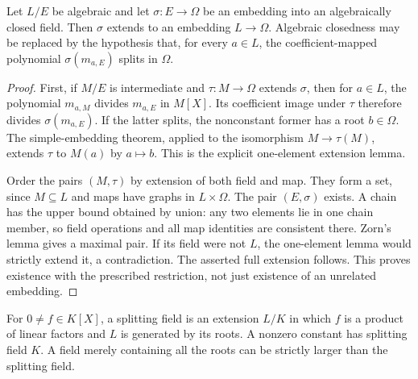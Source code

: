 \begin{theorem}\label{thm:field-extension-embedding}
Let $L/E$ be algebraic and let $\sigma:E\to\Omega$ be an embedding into an algebraically closed field. Then $\sigma$ extends to an embedding $L\to\Omega$. Algebraic closedness may be replaced by the hypothesis that, for every $a\in L$, the coefficient-mapped polynomial $\sigma(m_{a,E})$ splits in $\Omega$.
\end{theorem}
\begin{proof}
First, if $M/E$ is intermediate and $\tau:M\to\Omega$ extends $\sigma$, then for $a\in L$, the polynomial $m_{a,M}$ divides $m_{a,E}$ in $M[X]$. Its coefficient image under $\tau$ therefore divides $\sigma(m_{a,E})$. If the latter splits, the nonconstant former has a root $b\in\Omega$. The simple-embedding theorem, applied to the isomorphism $M\to\tau(M)$, extends $\tau$ to $M(a)$ by $a\mapsto b$. This is the explicit one-element extension lemma.

Order the pairs $(M,\tau)$ by extension of both field and map. They form a set, since $M\subseteq L$ and maps have graphs in $L\times\Omega$. The pair $(E,\sigma)$ exists. A chain has the upper bound obtained by union: any two elements lie in one chain member, so field operations and all map identities are consistent there. Zorn's lemma gives a maximal pair. If its field were not $L$, the one-element lemma would strictly extend it, a contradiction. The asserted full extension follows. This proves existence with the prescribed restriction, not just existence of an unrelated embedding.
\end{proof}

\begin{definition}
For $0\ne f\in K[X]$, a splitting field is an extension $L/K$ in which $f$ is a product of linear factors and $L$ is generated by its roots. A nonzero constant has splitting field $K$. A field merely containing all the roots can be strictly larger than the splitting field.
\end{definition}

